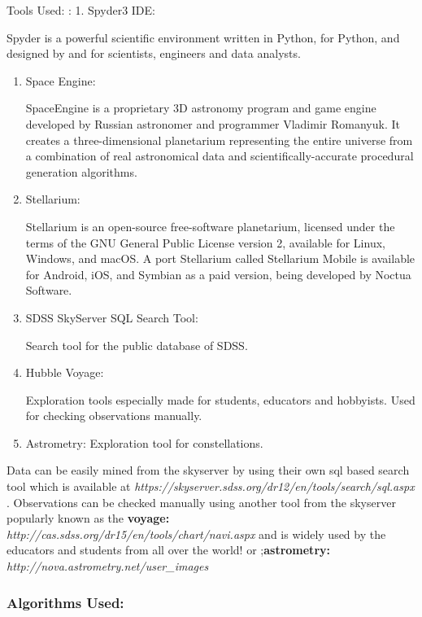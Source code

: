 \documentclass[11pt]{article}
\providecommand{\tightlist}{%
      \setlength{\itemsep}{0pt}\setlength{\parskip}{0pt}}
\begin{document}
Tools Used: : 1. Spyder3 IDE:

Spyder is a powerful scientific environment written in Python, for
Python, and designed by and for scientists, engineers and data analysts.

\begin{enumerate}
\def\labelenumi{\arabic{enumi}.}
\setcounter{enumi}{1}
\tightlist
\item
  Space Engine:

  SpaceEngine is a proprietary 3D astronomy program and game engine
  developed by Russian astronomer and programmer Vladimir Romanyuk. It
  creates a three-dimensional planetarium representing the entire
  universe from a combination of real astronomical data and
  scientifically-accurate procedural generation algorithms.
\item
  Stellarium:

  Stellarium is an open-source free-software planetarium, licensed under
  the terms of the GNU General Public License version 2, available for
  Linux, Windows, and macOS. A port Stellarium called Stellarium Mobile
  is available for Android, iOS, and Symbian as a paid version, being
  developed by Noctua Software.
\item
  SDSS SkyServer SQL Search Tool:

  Search tool for the public database of SDSS.
\item
  Hubble Voyage:

  Exploration tools especially made for students, educators and
  hobbyists. Used for checking observations manually.
\item
  Astrometry: Exploration tool for constellations.
\end{enumerate}

Data can be easily mined from the skyserver by using their own sql based
search tool which is available at
\emph{https://skyserver.sdss.org/dr12/en/tools/search/sql.aspx }.
Observations can be checked manually using another tool from the
skyserver popularly known as the \textbf{voyage:}
\emph{http://cas.sdss.org/dr15/en/tools/chart/navi.aspx} and is widely
used by the educators and students from all over the world! or
;\textbf{astrometry:} \emph{http://nova.astrometry.net/user\_images}

    \subsubsection{Algorithms Used:}\label{algorithms-used}
\end{document}
